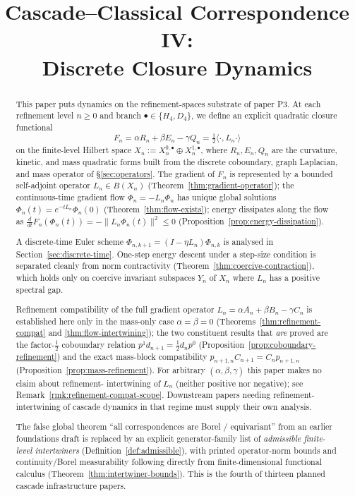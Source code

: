 \documentclass[11pt, a4paper]{amsart}
\title{Cascade--Classical Correspondence IV:\\
  Discrete Closure Dynamics}
\author{}
\date{}
\theoremstyle{definition}
\begin{document}
\maketitle

\begin{abstract}
This paper puts dynamics on the refinement-spaces substrate of paper
P3. At each refinement level $n \geq 0$ and branch $\bullet \in
\{H_4, D_4\}$, we define an explicit quadratic closure functional
\[
  F_n = \alpha R_n + \beta E_n - \gamma Q_n
    = \tfrac{1}{2} \langle \cdot, L_n \cdot \rangle
\]
on the finite-level Hilbert space $X_n := X_n^{0, \bullet} \oplus
X_n^{1, \bullet}$, where $R_n, E_n, Q_n$ are the curvature, kinetic,
and mass quadratic forms built from the discrete coboundary,
graph Laplacian, and mass operator of \S\ref{sec:operators}. The
gradient of $F_n$ is represented by a bounded self-adjoint
operator $L_n \in B(X_n)$
(Theorem~\ref{thm:gradient-operator}); the continuous-time gradient
flow $\dot\Phi_n = -L_n \Phi_n$ has unique global solutions
$\Phi_n(t) = e^{-t L_n} \Phi_n(0)$
(Theorem~\ref{thm:flow-exists}); energy dissipates along the flow
as $\frac{d}{dt} F_n(\Phi_n(t)) = -\|L_n \Phi_n(t)\|^2 \leq 0$
(Proposition~\ref{prop:energy-dissipation}).

A discrete-time Euler scheme $\Phi_{n, k+1} = (I - \eta L_n)
\Phi_{n, k}$ is analysed in
Section~\ref{sec:discrete-time}. One-step energy descent under a
step-size condition is separated cleanly from norm contractivity
(Theorem~\ref{thm:coercive-contraction}), which holds only on
coercive invariant subspaces $Y_n$ of $X_n$ where $L_n$ has a
positive spectral gap.

Refinement compatibility of the full gradient operator
$L_n = \alpha A_n + \beta B_n - \gamma C_n$ is established here
only in the mass-only case $\alpha = \beta = 0$
(Theorems~\ref{thm:refinement-compat} and
\ref{thm:flow-intertwining}); the two constituent results that
\emph{are} proved are the factor-$\tfrac{1}{2}$ coboundary
relation $p^1 d_{n+1} = \tfrac{1}{2} d_n p^0$
(Proposition~\ref{prop:coboundary-refinement}) and the exact
mass-block compatibility $p_{n+1, n} C_{n+1} = C_n p_{n+1, n}$
(Proposition~\ref{prop:mass-refinement}). For arbitrary $(\alpha,
\beta, \gamma)$ this paper makes no claim about refinement-
intertwining of $L_n$ (neither positive nor negative); see
Remark~\ref{rmk:refinement-compat-scope}. Downstream papers
needing refinement-intertwining of cascade dynamics in that
regime must supply their own analysis.

The false global theorem ``all correspondences are Borel /
equivariant'' from an earlier foundations draft is replaced by an
explicit generator-family list of \emph{admissible finite-level
intertwiners} (Definition~\ref{def:admissible}), with printed
operator-norm bounds and continuity/Borel measurability following
directly from finite-dimensional functional calculus
(Theorem~\ref{thm:intertwiner-bounds}). This is the fourth of
thirteen planned cascade infrastructure papers.


\end{abstract}
\end{document}
